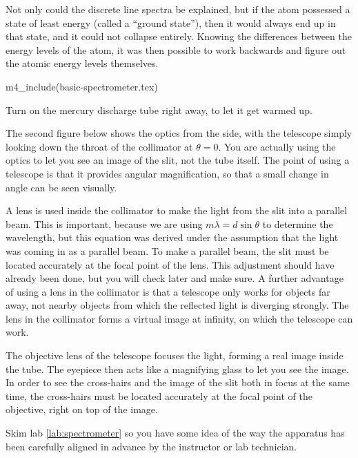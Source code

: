 Not only could the discrete line spectra be explained, but
if the atom possessed a state of least energy (called a
``ground state''), then it would always end up in that
state, and it could not collapse entirely. Knowing the
differences between the energy levels of the atom, it was
then possible to work backwards and figure out the atomic energy levels
themselves. 

m4_include(basic-spectrometer.tex)

\observations

Turn on the mercury discharge tube right away, to let it get warmed up.

\setcounter{labpartctr}{0}


The second figure below shows the optics from the side, with the
telescope simply looking down the throat of the collimator
at $\theta=0$. You are actually using the optics to let you
see an image of the slit, not the tube itself. The point of
using a telescope is that it provides angular magnification,
so that a small change in angle can be seen visually.

A lens is used inside the collimator to make the light from
the slit into a parallel beam. This is important, because we
are using $m\lambda =d\sin\theta$ to determine the
wavelength, but this equation was derived under the
assumption that the light was coming in as a parallel beam.
To make a parallel beam, the slit must be located accurately
at the focal point of the lens. This adjustment should have
already been done, but you will check later and make sure. A
further advantage of using a lens in the collimator is that
a telescope only works for objects far away, not nearby
objects from which the reflected light is diverging
strongly.  The lens in the collimator forms a virtual image
at infinity, on which the telescope can work.

The objective lens of the telescope focuses the light,
forming a real image inside the tube. The eyepiece then acts
like a magnifying glass to let you see the image. In order
to see the cross-hairs and the image of the slit both in
focus at the same time, the cross-hairs must be located
accurately at the focal point of the objective, right
on top of the image.

\setup

Skim lab \ref{lab:spectrometer} so you have some idea of the way the apparatus
has been carefully aligned in advance by the instructor or lab technician.


